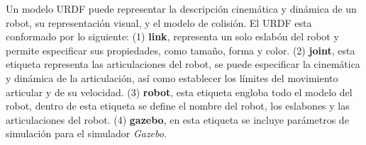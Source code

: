 Un modelo URDF puede representar la descripción cinemática y dinámica de un robot, su 
representación visual, y el modelo de colisión. El URDF esta conformado por lo siguiente: 
(1) \textbf{link}, representa un solo eslabón del robot y permite especificar sus propiedades, 
como tamaño, forma y color. (2) \textbf{joint}, esta etiqueta representa las articulaciones del 
robot, se puede especificar la cinemática y dinámica de la articulación, así como establecer 
los límites del movimiento articular y de su velocidad. (3) \textbf{robot}, esta etiqueta 
engloba todo el modelo del robot, dentro de esta etiqueta se define el nombre del robot, los 
eslabones y las articulaciones del robot. (4) \textbf{gazebo}, en esta etiqueta se incluye 
parámetros de simulación para el simulador \textit{Gazebo}.





